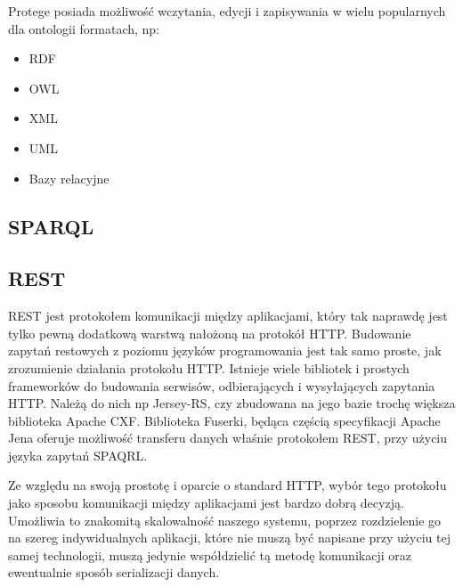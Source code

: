 Protege posiada możliwość wczytania, edycji i zapisywania w wielu popularnych dla ontologii formatach, np:
\begin{itemize}
\item RDF
\item OWL
\item XML
\item UML
\item Bazy relacyjne
\end{itemize}

\subsection{SPARQL}
\label{sec:sparql}

\subsection{REST}
\label{sec:rest}

REST jest protokołem komunikacji między aplikacjami, który tak naprawdę jest tylko pewną dodatkową warstwą nałożoną na protokół HTTP. Budowanie zapytań restowych z poziomu języków programowania jest tak samo proste, jak zrozumienie działania protokołu HTTP. Istnieje wiele bibliotek i prostych frameworków do budowania serwisów, odbierających i wysyłających zapytania HTTP. Należą do nich np Jersey-RS, czy zbudowana na jego bazie trochę większa biblioteka Apache CXF. Biblioteka Fuserki, będąca częścią specyfikacji Apache Jena oferuje możliwość transferu danych właśnie protokołem REST, przy użyciu języka zapytań SPAQRL. 

Ze względu na swoją prostotę i oparcie o standard HTTP, wybór tego protokołu jako sposobu komunikacji między aplikacjami jest bardzo dobrą decyzją. Umożliwia to znakomitą skalowalność naszego systemu, poprzez rozdzielenie go na szereg indywidualnych aplikacji, które nie muszą być napisane przy użyciu tej samej technologii, muszą jedynie współdzielić tą metodę komunikacji oraz ewentualnie sposób serializacji danych.

